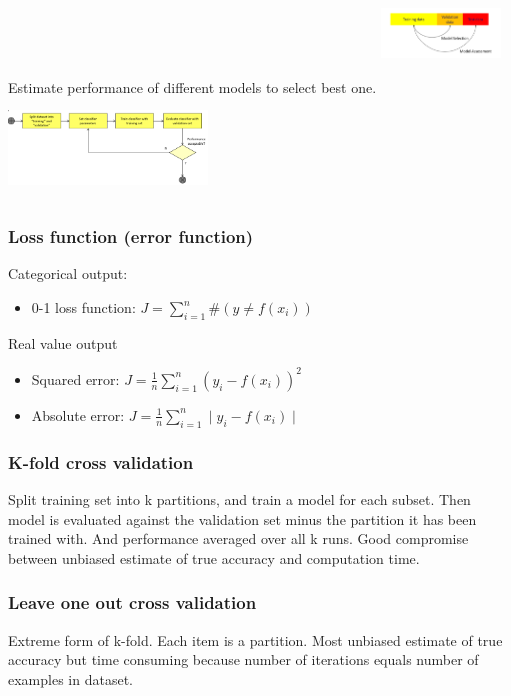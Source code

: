 Estimate performance of different models to select best one.
\includegraphics[height=120px, width=120px]{modass}
\includegraphics[height=100px, width=200px]{modsel}

\subsubsection{Loss function (error function)}
Categorical output:
\begin{itemize}
\item 0-1 loss function: $ J = \sum_{i=1}^n \#(y \neq f(x_i)) $
\end{itemize}
Real value output
\begin{itemize}
\item Squared error: $ J = \frac{1}{n} \sum_{i=1}^n (y_i - f(x_i))^2 $
\item Absolute error: $ J = \frac{1}{n}\sum_{i=1}^n \mid y_i - f(x_i)
  \mid $
\end{itemize}

\subsubsection{K-fold cross validation}

Split training set into k partitions, and train a model for each
subset. Then model is evaluated against the validation set minus the
partition it has been trained with. And performance averaged over all
k runs. Good compromise between unbiased estimate of true accuracy and
computation time.

\subsubsection{Leave one out cross validation}
Extreme form of k-fold. Each item is a partition. Most unbiased
estimate of true accuracy but time consuming because number of
iterations equals number of examples in dataset.

